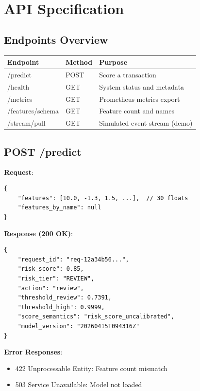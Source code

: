\documentclass[12pt,a4paper]{article}
\begin{document}
\section{API Specification}

\subsection{Endpoints Overview}

\begin{table}[H]
\centering
\small
\begin{tabular}{|l|l|l|}
\hline
\textbf{Endpoint} & \textbf{Method} & \textbf{Purpose} \\
\hline
/predict & POST & Score a transaction \\
/health & GET & System status and metadata \\
/metrics & GET & Prometheus metrics export \\
/features/schema & GET & Feature count and names \\
/stream/pull & GET & Simulated event stream (demo) \\
\hline
\end{tabular}
\end{table}

\subsection{POST /predict}

\textbf{Request}:
\begin{lstlisting}
{
    "features": [10.0, -1.3, 1.5, ...],  // 30 floats
    "features_by_name": null
}
\end{lstlisting}

\textbf{Response (200 OK)}:
\begin{lstlisting}
{
    "request_id": "req-12a34b56...",
    "risk_score": 0.85,
    "risk_tier": "REVIEW",
    "action": "review",
    "threshold_review": 0.7391,
    "threshold_high": 0.9999,
    "score_semantics": "risk_score_uncalibrated",
    "model_version": "20260415T094316Z"
}
\end{lstlisting}

\textbf{Error Responses}:
\begin{itemize}
    \item 422 Unprocessable Entity: Feature count mismatch
    \item 503 Service Unavailable: Model not loaded
\end{itemize}
\end{document}
